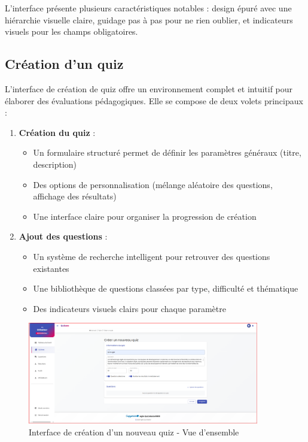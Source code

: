 \documentclass[12pt,a4paper]{report}
\begin{document}
L'interface présente plusieurs caractéristiques notables : design épuré avec une hiérarchie visuelle claire, guidage pas à pas pour ne rien oublier, et indicateurs visuels pour les champs obligatoires.

\subsection{Création d'un quiz}

L'interface de création de quiz offre un environnement complet et intuitif pour élaborer des évaluations pédagogiques. Elle se compose de deux volets principaux :

\begin{enumerate}
\item \textbf{Création du quiz} :
   \begin{itemize}
   \item Un formulaire structuré permet de définir les paramètres généraux (titre, description)
   \item Des options de personnalisation (mélange aléatoire des questions, affichage des résultats)
   \item Une interface claire pour organiser la progression de création
   \end{itemize}

\item \textbf{Ajout des questions} :
   \begin{itemize}
   \item Un système de recherche intelligent pour retrouver des questions existantes
   \item Une bibliothèque de questions classées par type, difficulté et thématique
   \item Des indicateurs visuels clairs pour chaque paramètre
   \end{itemize}
\end{enumerate}

\begin{figure}[H]
\centering
\includegraphics[width=0.9\textwidth]{latex_media/media/image56.png}
\caption{Interface de création d'un nouveau quiz - Vue d'ensemble}
\label{fig:creation-quiz-overview}
\end{figure}
\end{document}

